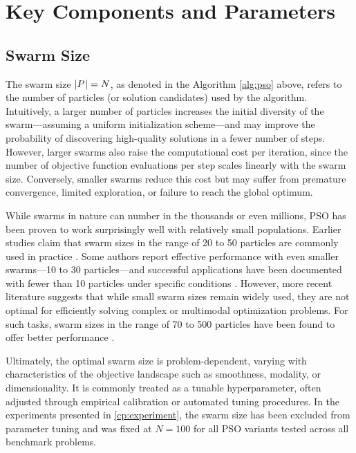 {%



\section{Key Components and Parameters}

\subsection{Swarm Size}

The swarm size \( \lvert P\mkern1mu\rvert = N \), as denoted in the Algorithm \ref{alg:pso} above, refers to the number of particles (or solution candidates) used by the algorithm.  Intuitively, a larger number of particles increases the initial diversity of the swarm—assuming a uniform initialization scheme—and may improve the probability of discovering high-quality solutions in a fewer number of steps. However, larger swarms also raise the computational cost per iteration, since the number of objective function evaluations per step scales linearly with the swarm size. Conversely, smaller swarms reduce this cost but may suffer from premature convergence, limited exploration, or failure to reach the global optimum.

While swarms in nature can number in the thousands or even millions, PSO has been proven to work surprisingly well with relatively small populations. Earlier studies claim that swarm sizes in the range of 20 to 50 particles are commonly used in practice \citep{poli2007particle}. Some authors report effective performance with even smaller swarms---10 to 30 particles---and successful applications have been documented with fewer than 10 particles under specific conditions \citep{engelbrecht2007computational, vandenbergh2002analysis}. However, more recent literature suggests that while small swarm sizes remain widely used, they are not optimal for efficiently solving complex or multimodal optimization problems. For such tasks, swarm sizes in the range of 70 to 500 particles have been found to offer better performance \citep{abualigah2025particle}.

Ultimately, the optimal swarm size is problem-dependent, varying with characteristics of the objective landscape such as smoothness, modality, or dimensionality. It is commonly treated as a tunable hyperparameter, often adjusted through empirical calibration or automated tuning procedures. In the experiments presented in \autoref{cp:experiment}, the swarm size has been excluded from parameter tuning and was fixed at \( N = 100 \) for all PSO variants tested across all benchmark problems.


}
